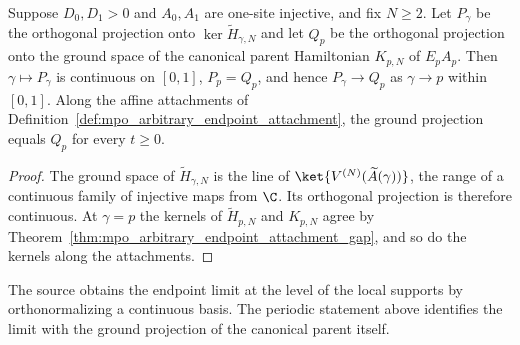 \begin{lemma}
    \label{thm:mpo_arbitrary_ground_projection}
    \leanok
    Suppose $D_0,D_1>0$ and $A_0,A_1$ are one-site injective, and fix
    $N\geq2$. Let $P_\gamma$ be the orthogonal projection onto
    $\ker\widetilde H_{\gamma,N}$ and let $Q_p$ be the orthogonal
    projection onto the ground space of the canonical parent Hamiltonian
    $K_{p,N}$ of $E_pA_p$. Then $\gamma\mapsto P_\gamma$ is continuous on
    $[0,1]$, $P_p=Q_p$, and hence $P_\gamma\to Q_p$ as $\gamma\to p$
    within $[0,1]$. Along the affine attachments of
    Definition~\ref{def:mpo_arbitrary_endpoint_attachment}, the ground
    projection equals $Q_p$ for every $t\geq0$.
\end{lemma}
\begin{proof}
    \leanok
    The ground space of $\widetilde H_{\gamma,N}$ is the line of
    $\ket{V^{(N)}(\widetilde A(\gamma))}$, the range of a continuous
    family of injective maps from $\C$. Its orthogonal projection is
    therefore continuous. At $\gamma=p$ the kernels of $\widetilde
        H_{p,N}$ and $K_{p,N}$ agree by
    Theorem~\ref{thm:mpo_arbitrary_endpoint_attachment_gap}, and so do
    the kernels along the attachments.
\end{proof}

The source obtains the endpoint limit at the level of the local supports
by orthonormalizing a continuous basis. The periodic statement above
identifies the limit with the ground projection of the canonical parent
itself.

